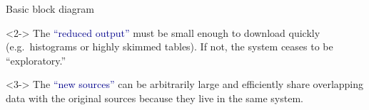 \documentclass[aspectratio=169]{beamer}
\begin{document}
\begin{frame}{Basic block diagram}
\vspace{0.25 cm}
\begin{center}
\end{center}

\begin{uncoverenv}<2->
The \textcolor{darkblue}{``reduced output''} must be small enough to download quickly (e.g.\ histograms or highly skimmed tables). If not, the system ceases to be ``exploratory.''
\end{uncoverenv}

\vspace{0.25 cm}
\begin{uncoverenv}<3->
The \textcolor{darkblue}{``new sources''} can be arbitrarily large and efficiently share overlapping data with the original sources because they live in the same system.
\end{uncoverenv}
\end{frame}
\end{document}
